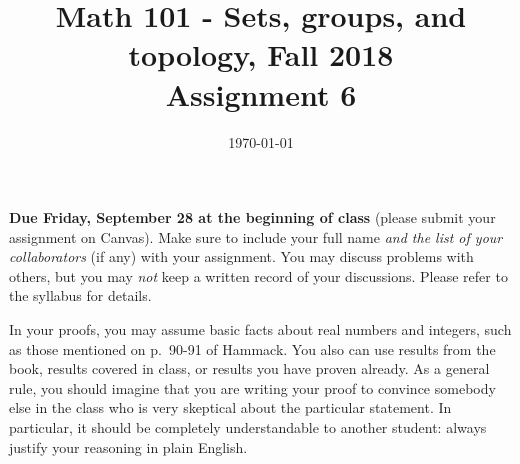 \documentclass{amsart}
\title[Math 101, Fall 2018: assignment 6]{Math 101 - Sets, groups, and topology, Fall 2018 \\ Assignment 6}
\date{\today}
\theoremstyle{definition}
\begin{document}

\maketitle

\textbf{Due Friday, September 28 at the beginning of class} (please submit your assignment on Canvas). Make sure to include your full name \emph{and the list of your collaborators} (if any) with your assignment. You may discuss problems with others, but you may \emph{not} keep a written record of your discussions. Please refer to the syllabus for details.

In your proofs, you may assume basic facts about real numbers and integers, such as those mentioned on p.~90-91 of Hammack. You also can use results from the book, results covered in class, or results you have proven already. As a general rule, you should imagine that you are writing your proof to convince somebody else in the class who is very skeptical about the particular statement. In particular, it should be completely understandable to another student: always justify your reasoning in plain English. 
\end{document}
